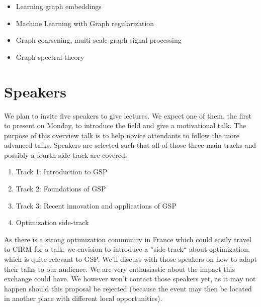 \documentclass[a4paper]{scrartcl}
\begin{document}
\begin{itemize}
	\item Learning graph embeddings \cite{von2008consistency,zhou2006learning,belkin2003laplacian}
	\item Machine Learning with Graph regularization \cite{smola,belkin2005towards,zhou2004regularization,zhou2005learning,belkin2006manifold}
	\item Graph coarsening, multi-scale graph signal processing \cite{spielman2011graph,shuman2016multiscale,liu_coarsening,lafon_coarse,jansen}
	\item Graph spectral theory \cite{chung1997spectral,belkin2007convergence,shuman2015vertex,sandryhaila2014discrete,Nakatsukasa2013mysteries,brooks,dekel}
\end{itemize}

\section{Speakers}

We plan to invite five speakers to give lectures. We expect one of them, the
first to present on Monday, to introduce the field and give a motivational talk.
The purpose of this overview talk is to help novice attendants to follow the
more advanced talks. Speakers are selected such that all of those three
main tracks and possibly a fourth side-track are covered:

\begin{enumerate}
	\setlength{\itemsep}{0pt} \setlength{\parskip}{0pt}
	\item Track 1: Introduction to GSP
	\item Track 2: Foundations of GSP
	\item Track 3: Recent innovation and applications of GSP
	\item Optimization side-track
\end{enumerate} 

As there is a strong optimization community in France which could easily travel
to CIRM for a talk, we envision to introduce a ''side track`` about
optimization, which is quite relevant to GSP. We'll discuss with those speakers
on how to adapt their talks to our audience. We are very enthusiastic about the
impact this exchange could have. We however won't contact those speakers yet, as
it may not happen should this proposal be rejected (because the event may then
be located in another place with different local opportunities).
\end{document}
